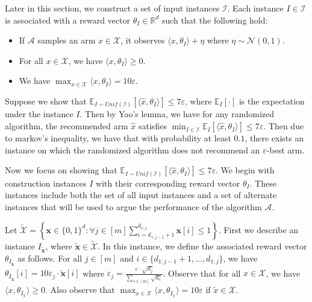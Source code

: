 Later in this section, we construct a set of input instances $\mathcal{I}$. Each instance $I\in \mathcal{I}$ is associated with a reward vector $\theta_I\in \mathbb{R}^d$ such that the following hold:
\begin{itemize}
    \item If $\mathcal{A}$ samples an arm $x\in \mathcal{X}$, it observes $\langle x,\theta_I\rangle+\eta$ where $\eta\sim \mathcal{N}(0,1)$.
    \item For all $x\in \mathcal{X}$, we have $\langle x,\theta_I\rangle\geq 0$.
    \item We have $\max_{x\in \mathcal{X}}\langle x,\theta_I\rangle=10\varepsilon$.
\end{itemize}

Suppose we show that $\mathbb{E}_{I\sim Unif(\mathcal{I})}[\langle \widehat{x}, \theta_I\rangle]\leq 7\varepsilon$, where $\mathbb E_{I}[\cdot]$ is the expectation under the instance $I$. Then by Yao's lemma, we have for any randomized algorithm, the recommended arm $\widehat{x}$ satisfies $\min_{I\in \mathcal{I}}\mathbb E_{I}[\langle \widehat{x},\theta_I\rangle]\leq 7\varepsilon$. Then due to markov's inequality, we have that with probability at least $0.1$, there exists an instance on which the randomized algorithm does not recommend an $\varepsilon$-best arm.

Now we focus on showing that $\mathbb{E}_{I\sim Unif(\mathcal{I})}[\langle \widehat{x}, \theta_I\rangle]\leq 7\varepsilon$. We begin with construction instances $I$ with their corresponding reward vector $\theta_I$. These instances include both the set of all input instances and a set of alternate instances that will be used to argue the performance of the algorithm $\mathcal{A}$.


Let $\tilde{\mathcal{X}}=\left\{\mathbf{x}\in \{0,1\}^d: \forall j\in [m] \sum_{i=d_{1:j-1}+1}^{d_{1:j}} \mathbf{x}[i]\leq 1\right\}$.
First we describe an instance $I_{\tilde{\mathbf{x}}}$, where $\tilde{\mathbf{x}}\in \tilde{\mathcal{X}}$. In this instance, we define the associated reward vector $\theta_{I_{\tilde{\mathbf{x}}}}$ as follows. For all $j\in [m]$ and $i\in \{d_{1:j-1}+1,\ldots,d_{1:j}\}$, we have $\theta_{I_{\tilde{\mathbf{x}}}}[i]=10\varepsilon_j\cdot \tilde{\mathbf{x}}[i]$ where $\varepsilon_j=\frac{\varepsilon\cdot\sqrt{d_j}}{\sum_{s\in[m]}\sqrt{d_s}}$. Observe that for all $x\in\mathcal{X}$, we have $\langle x,\theta_{I_{\tilde x}}\rangle\geq 0$. Also observe that $\max_{x\in\mathcal{X}}\langle x,\theta_{I_{\tilde x}}\rangle=10\varepsilon$ if $\tilde{x}\in \mathcal{X}$.

